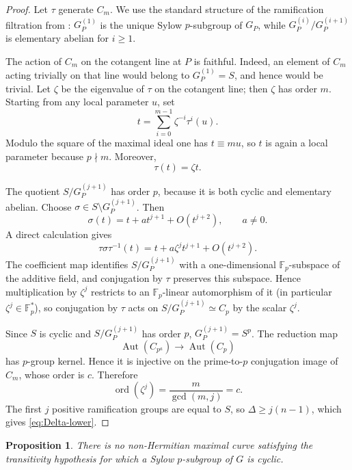 \documentclass[11pt]{amsart}
\newtheorem{proposition}[theorem]{Proposition}
\theoremstyle{remark}
\newcommand{\F}{\mathbb F}
\newcommand{\Aut}{\operatorname{Aut}}
\begin{document}
\begin{proof}
Let $\tau$ generate $C_m$.  We use the standard structure of the
ramification filtration from
\cite[Proposition~3.8.5]{Stichtenoth}: $G_P^{(1)}$ is the unique
Sylow $p$-subgroup of $G_P$, while
$G_P^{(i)}/G_P^{(i+1)}$ is elementary abelian for $i\ge1$.

The action of $C_m$ on the cotangent line at $P$ is faithful.  Indeed,
an element of $C_m$ acting trivially on that line would belong to
$G_P^{(1)}=S$, and hence would be trivial.  Let $\zeta$ be the
eigenvalue of $\tau$ on the cotangent line; then $\zeta$ has order
$m$.  Starting from any local parameter $u$, set
\[
       t=\sum_{i=0}^{m-1}\zeta^{-i}\tau^i(u).
\]
Modulo the square of the maximal ideal one has
$t\equiv m u$, so $t$ is again a local parameter because $p\nmid m$.
Moreover,
\[
       \tau(t)=\zeta t.
\]

The quotient $S/G_P^{(j+1)}$ has order $p$, because it is both cyclic
and elementary abelian.  Choose
$\sigma\in S\setminus G_P^{(j+1)}$.  Then
\[
          \sigma(t)=t+a t^{j+1}+O(t^{j+2}),
          \qquad a\ne0.
\]
A direct calculation gives
\[
          \tau\sigma\tau^{-1}(t)
          =t+a\zeta^j t^{j+1}+O(t^{j+2}).
\]
The coefficient map identifies
$S/G_P^{(j+1)}$ with a one-dimensional $\F_p$-subspace of the additive
field, and conjugation by $\tau$ preserves this subspace.  Hence
multiplication by $\zeta^j$ restricts to an $\F_p$-linear automorphism
of it (in particular $\zeta^j\in\F_p^*$), so conjugation by $\tau$
acts on $S/G_P^{(j+1)}\simeq C_p$ by the scalar $\zeta^j$.

Since $S$ is cyclic and $S/G_P^{(j+1)}$ has order $p$,
$G_P^{(j+1)}=S^p$.  The reduction map
\[
          \Aut(C_{p^a})\longrightarrow\Aut(C_p)
\]
has $p$-group kernel.  Hence it is injective on the prime-to-$p$
conjugation image of $C_m$, whose order is $c$.  Therefore
\[
          \operatorname{ord}(\zeta^j)
          =\frac{m}{\gcd(m,j)}=c.
\]
The first $j$ positive ramification groups are equal to $S$, so
$\Delta\ge j(n-1)$, which gives \eqref{eq:Delta-lower}.

\end{proof}

\begin{proposition}\label{prop:cyclic}
There is no non-Hermitian maximal curve satisfying the transitivity
hypothesis for which a Sylow $p$-subgroup of $G$ is cyclic.
\end{proposition}
\end{document}
